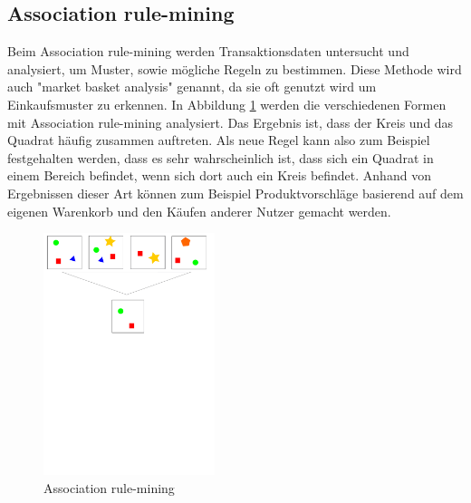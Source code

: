 	 \subsection{Association rule-mining}
	 Beim Association rule-mining werden Transaktionsdaten untersucht und analysiert, um Muster, sowie mögliche Regeln zu bestimmen. Diese Methode wird auch "market basket analysis" genannt, da sie oft genutzt wird um Einkaufsmuster zu erkennen. \cite{Sarkar2018} \newline
	 In Abbildung \ref{fig:abb5} werden die verschiedenen Formen mit Association rule-mining analysiert. Das Ergebnis ist, dass der Kreis und das Quadrat häufig zusammen auftreten. Als neue Regel kann also zum Beispiel festgehalten werden, dass es sehr wahrscheinlich ist, dass sich ein Quadrat in einem Bereich befindet, wenn sich dort auch ein Kreis befindet. \newline
	 Anhand von Ergebnissen dieser Art können zum Beispiel Produktvorschläge basierend auf dem eigenen Warenkorb und den Käufen anderer Nutzer gemacht werden.
	\begin{figure}[H]
		\centering
		\includegraphics[width=5cm]{Bilder/rule-mining.pdf}
		\caption{Association rule-mining}
		\label{fig:abb5}
	\end{figure}